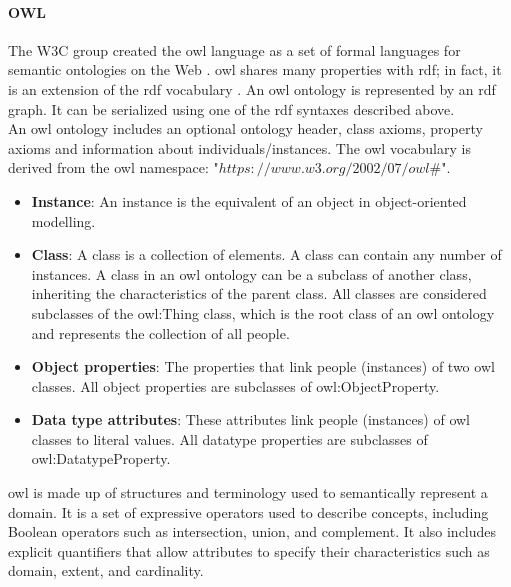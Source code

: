             \paragraph{OWL \label{para:owl}}
            The W3C group created the \acrshort{owl} language as a set of formal languages for semantic ontologies on the Web \cite{liu2010ontology}. \acrshort{owl} shares many properties with \acrshort{rdf}; in fact, it is an extension of the \acrshort{rdf} vocabulary \cite{mcguinness2004owl}. An \acrshort{owl} ontology is represented by an \acrshort{rdf} graph. It can be serialized using one of the \acrshort{rdf} syntaxes described above. \\
        
            An \acrshort{owl} ontology includes an optional ontology header, class axioms, property axioms and information about individuals/instances. The \acrshort{owl} vocabulary is derived from the \acrshort{owl} namespace: "$https://www.w3.org/2002/07/owl\#$". 
        
            \begin{itemize}
                \item \textbf{Instance}: An instance is the equivalent of an object in object-oriented modelling. 
                \item \textbf{Class}: A class is a collection of elements. A class can contain any number of instances. A class in an \acrshort{owl} ontology can be a subclass of another class, inheriting the characteristics of the parent class. All classes are considered subclasses of the owl:Thing class, which is the root class of an \acrshort{owl} ontology and represents the collection of all people. 
                \item \textbf{Object properties}: The properties that link people (instances) of two \acrshort{owl} classes. All object properties are subclasses of owl:ObjectProperty. 
                \item \textbf{Data type attributes}: These attributes link people (instances) of \acrshort{owl} classes to literal values. All datatype properties are subclasses of owl:DatatypeProperty.
            \end{itemize}
        
            \acrshort{owl} is made up of structures and terminology used to semantically represent a domain. It is a set of expressive operators used to describe concepts, including Boolean operators such as intersection, union, and complement. It also includes explicit quantifiers that allow attributes to specify their characteristics such as domain, extent, and cardinality.\\
        
